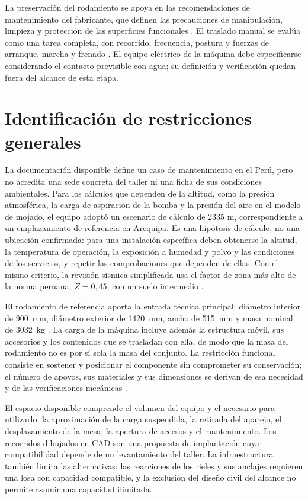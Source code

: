 La preservación del rodamiento se apoya en las recomendaciones de mantenimiento del fabricante, que definen las precauciones de manipulación, limpieza y protección de las superficies funcionales \cite{skfmaintenance2011}. El traslado manual se evalúa como una tarea completa, con recorrido, frecuencia, postura y fuerzas de arranque, marcha y frenado \cite{iso11228}. El equipo eléctrico de la máquina debe especificarse considerando el contacto previsible con agua; su definición y verificación quedan fuera del alcance de esta etapa.

\section{Identificación de restricciones generales}
\label{sec:restricciones-generales}

La documentación disponible define un caso de mantenimiento en el Perú, pero no acredita una sede concreta del taller ni una ficha de sus condiciones ambientales. Para los cálculos que dependen de la altitud, como la presión atmosférica, la carga de aspiración de la bomba y la presión del aire en el modelo de mojado, el equipo adoptó un escenario de cálculo de 2335 m, correspondiente a un emplazamiento de referencia en Arequipa. Es una hipótesis de cálculo, no una ubicación confirmada: para una instalación específica deben obtenerse la altitud, la temperatura de operación, la exposición a humedad y polvo y las condiciones de los servicios, y repetir las comprobaciones que dependen de ellas. Con el mismo criterio, la revisión sísmica simplificada usa el factor de zona más alto de la norma peruana, $Z=0{,}45$, con un suelo intermedio \cite{e030}.

El rodamiento de referencia aporta la entrada técnica principal: diámetro interior de 900~mm, diámetro exterior de 1420~mm, ancho de 515~mm y masa nominal de 3032~kg \cite{skf241}. La carga de la máquina incluye además la estructura móvil, sus accesorios y los contenidos que se trasladan con ella, de modo que la masa del rodamiento no es por sí sola la masa del conjunto. La restricción funcional consiste en sostener y posicionar el componente sin comprometer su conservación; el número de apoyos, sus materiales y sus dimensiones se derivan de esa necesidad y de las verificaciones mecánicas \cite{skfmaintenance2011}.

El espacio disponible comprende el volumen del equipo y el necesario para utilizarlo: la aproximación de la carga suspendida, la retirada del aparejo, el desplazamiento de la mesa, la apertura de accesos y el mantenimiento. Los recorridos dibujados en CAD son una propuesta de implantación cuya compatibilidad depende de un levantamiento del taller. La infraestructura también limita las alternativas: las reacciones de los rieles y sus anclajes requieren una losa con capacidad compatible, y la exclusión del diseño civil del alcance no permite asumir una capacidad ilimitada.


